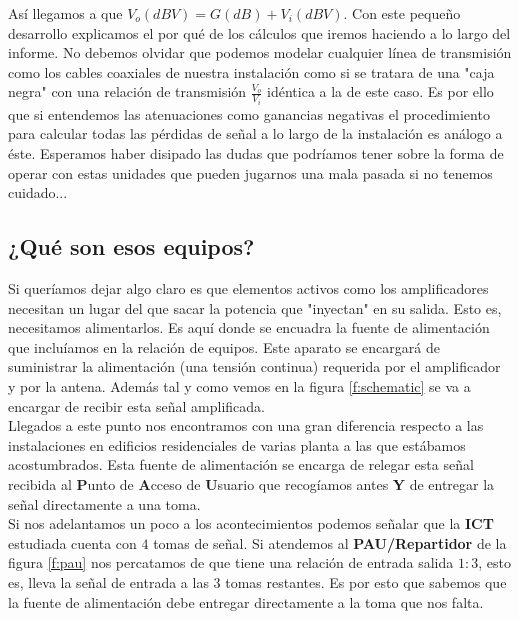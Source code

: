 \documentclass{article}[12 pt]
\begin{document}
			Así llegamos a que $V_o(dBV) = G(dB) + V_i(dBV)$. Con este pequeño desarrollo explicamos el por qué de los cálculos que iremos haciendo a lo largo del informe. No debemos olvidar que podemos modelar cualquier línea de transmisión como los cables coaxiales de nuestra instalación como si se tratara de una "caja negra" con una relación de transmisión $\frac{V_o}{V_i}$ idéntica a la de este caso. Es por ello que si entendemos las atenuaciones como ganancias negativas el procedimiento para calcular todas las pérdidas de señal a lo largo de la instalación es análogo a éste. Esperamos haber disipado las dudas que podríamos tener sobre la forma de operar con estas unidades que pueden jugarnos una mala pasada si no tenemos cuidado...\\

		\subsection{¿Qué son esos equipos?}
			Si queríamos dejar algo claro es que elementos activos como los amplificadores necesitan un lugar del que sacar la potencia que "inyectan" en su salida. Esto es, necesitamos alimentarlos. Es aquí donde se encuadra la fuente de alimentación que incluíamos en la relación de equipos. Este aparato se encargará de suministrar la alimentación (una tensión continua) requerida por el amplificador y por la antena. Además tal y como vemos en la figura \ref{f:schematic} se va a encargar de recibir esta señal amplificada.\\

			Llegados a este punto nos encontramos con una gran diferencia respecto a las instalaciones en edificios residenciales de varias planta a las que estábamos acostumbrados. Esta fuente de alimentación se encarga de relegar esta señal recibida al \textbf{P}unto de \textbf{A}cceso de \textbf{U}suario que recogíamos antes \textbf{Y} de entregar la señal directamente a una toma.\\

			Si nos adelantamos un poco a los acontecimientos podemos señalar que la \textbf{ICT} estudiada cuenta con $4$ tomas de señal. Si atendemos al \textbf{PAU/Repartidor} de la figura \ref{f:pau} nos percatamos de que tiene una relación de entrada salida $1:3$, esto es, lleva la señal de entrada a las $3$ tomas restantes. Es por esto que sabemos que la fuente de alimentación debe entregar directamente a la toma que nos falta.\\
\end{document}
